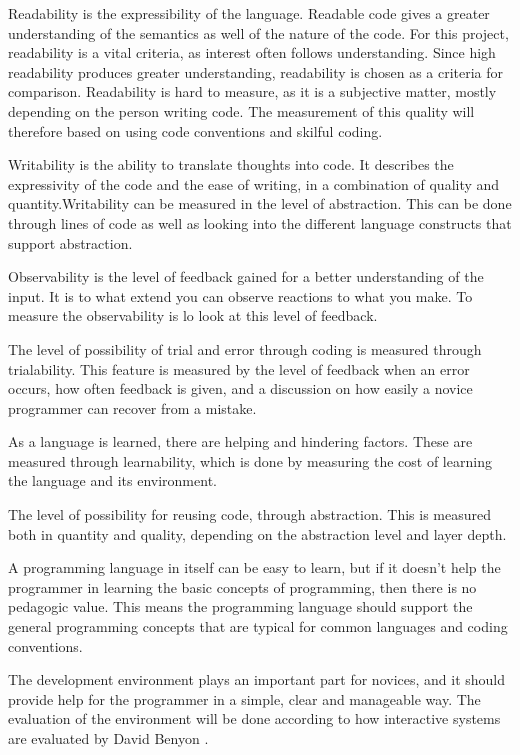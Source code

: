 \begin{description}[style=nextline]
\item[Readability] Readability is the expressibility of the language. Readable code gives a greater understanding of the semantics as well of the nature of the code. For this project, readability is a vital criteria, as interest often follows understanding. Since high readability produces greater understanding, readability is chosen as a criteria for comparison. Readability is hard to measure, as it is a subjective matter, mostly depending on the person writing code. The measurement of this quality will therefore based on using code conventions and skilful coding.
\item[Writability] Writability is the ability to translate thoughts into code. It describes the expressivity of the code and the ease of writing, in a combination of quality and quantity.Writability can be measured in the level of abstraction. This can be done through lines of code as well as looking into the different language constructs that support abstraction.
\item[Observability] Observability is the level of feedback gained for a better understanding of the input. It is to what extend you can observe reactions to what you make. To measure the observability is lo look at this level of feedback.
\item[Trialability] The level of possibility of trial and error through coding is measured through trialability. This feature is measured by the level of feedback when an error occurs, how often feedback is given, and a discussion on how easily a novice programmer can recover from a mistake.
\item[Learnability] As a language is learned, there are helping and hindering factors. These are measured through learnability, which is done by measuring the cost of learning the language and its environment.
\item[Reusability] The level of possibility for reusing code, through abstraction. This is measured both in quantity and quality, depending on the abstraction level and layer depth.
\item[Pedagogic Value] A programming language in itself can be easy to learn, but if it doesn't help the programmer in learning the basic concepts of programming, then there is no pedagogic value. This means the programming language should support the general programming concepts that are typical for common languages and coding conventions.
\item[Environment] The development environment plays an important part for novices, and it should provide help for the programmer in a simple, clear and manageable way. The evaluation of the environment will be done according to how interactive systems are evaluated by David Benyon \cite[p. 225-250]{design_book}.

\end{description}
